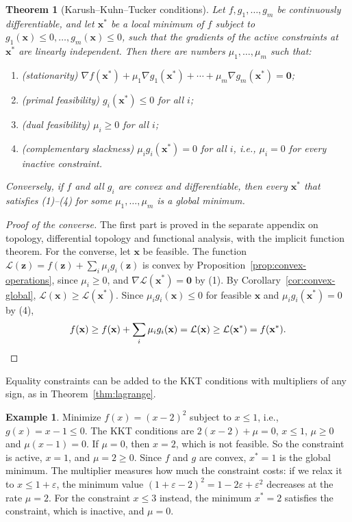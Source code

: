 \documentclass[11pt]{article}
\theoremstyle{definition}
\newtheorem{example}[definition]{Example}
\theoremstyle{plain}
\newtheorem{theorem}[definition]{Theorem}
\theoremstyle{remark}
\begin{document}
\begin{theorem}[Karush--Kuhn--Tucker conditions]\label{thm:kkt}
    Let $f, g_1, \ldots, g_m$ be continuously differentiable, and let $\mathbf{x}^*$ be a local minimum of $f$ subject to $g_1(\mathbf{x}) \leq 0, \ldots, g_m(\mathbf{x}) \leq 0$, such that the gradients of the active constraints at $\mathbf{x}^*$ are linearly independent. Then there are numbers $\mu_1, \ldots, \mu_m$ such that:
    \begin{enumerate}
        \item (stationarity) $\nabla f(\mathbf{x}^*) + \mu_1\nabla g_1(\mathbf{x}^*) + \cdots + \mu_m\nabla g_m(\mathbf{x}^*) = \mathbf{0}$;
        \item (primal feasibility) $g_i(\mathbf{x}^*) \leq 0$ for all $i$;
        \item (dual feasibility) $\mu_i \geq 0$ for all $i$;
        \item (complementary slackness) $\mu_i g_i(\mathbf{x}^*) = 0$ for all $i$, i.e., $\mu_i = 0$ for every inactive constraint.
    \end{enumerate}
    Conversely, if $f$ and all $g_i$ are convex and differentiable, then every $\mathbf{x}^*$ that satisfies (1)--(4) for some $\mu_1, \ldots, \mu_m$ is a global minimum.
\end{theorem}

\begin{proof}[Proof of the converse]
    The first part is proved in the separate appendix on topology, differential topology and functional analysis, with the implicit function theorem. For the converse, let $\mathbf{x}$ be feasible. The function $\mathcal{L}(\mathbf{z}) = f(\mathbf{z}) + \sum_i \mu_i g_i(\mathbf{z})$ is convex by Proposition~\ref{prop:convex-operations}, since $\mu_i \geq 0$, and $\nabla\mathcal{L}(\mathbf{x}^*) = \mathbf{0}$ by (1). By Corollary~\ref{cor:convex-global}, $\mathcal{L}(\mathbf{x}) \geq \mathcal{L}(\mathbf{x}^*)$. Since $\mu_i g_i(\mathbf{x}) \leq 0$ for feasible $\mathbf{x}$ and $\mu_i g_i(\mathbf{x}^*) = 0$ by (4),
    \[f(\mathbf{x}) \geq f(\mathbf{x}) + \sum_i \mu_i g_i(\mathbf{x}) = \mathcal{L}(\mathbf{x}) \geq \mathcal{L}(\mathbf{x}^*) = f(\mathbf{x}^*).\qedhere\]
\end{proof}

Equality constraints can be added to the KKT conditions with multipliers of any sign, as in Theorem~\ref{thm:lagrange}.

\begin{example}\label{ex:kkt-1d}
    Minimize $f(x) = (x - 2)^2$ subject to $x \leq 1$, i.e., $g(x) = x - 1 \leq 0$. The KKT conditions are $2(x - 2) + \mu = 0$, $x \leq 1$, $\mu \geq 0$ and $\mu(x - 1) = 0$. If $\mu = 0$, then $x = 2$, which is not feasible. So the constraint is active, $x = 1$, and $\mu = 2 \geq 0$. Since $f$ and $g$ are convex, $x^* = 1$ is the global minimum. The multiplier measures how much the constraint costs: if we relax it to $x \leq 1 + \varepsilon$, the minimum value $(1 + \varepsilon - 2)^2 = 1 - 2\varepsilon + \varepsilon^2$ decreases at the rate $\mu = 2$. For the constraint $x \leq 3$ instead, the minimum $x^* = 2$ satisfies the constraint, which is inactive, and $\mu = 0$.
\end{example}
\end{document}
